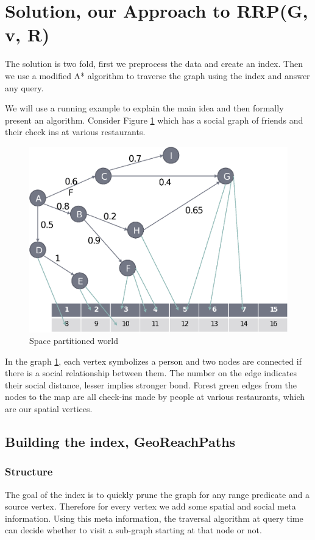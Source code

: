 \section{Solution, our Approach to RRP(G, v, R)}

{The solution is two fold, first we preprocess the data and create an index. Then we use a modified A* algorithm to traverse the graph using the index and answer any query.}

{We will use a running example to explain the main idea and then formally present an algorithm. Consider Figure \ref{fig:space-partitioned} which has a social graph of friends and their check ins at various restaurants.}

\begin{figure}[t]
	\includegraphics[width=0.9\linewidth]{images/image05.eps}
    \caption{Space partitioned world}
    \label{fig:space-partitioned}
\end{figure}

{In the graph \ref{fig:space-partitioned}, each vertex symbolizes a person and two nodes are connected if there is a social relationship between them. The number on the edge indicates their social distance, lesser implies stronger bond. Forest green edges from the nodes to the map are all check-ins made by people at various restaurants, which are our spatial vertices. }

\subsection{Building the index, GeoReachPaths}

\subsubsection{Structure}
The goal of the index is to quickly prune the graph for any range predicate and a source vertex. Therefore for every vertex we add some spatial and social meta information. Using this meta information, the traversal algorithm at query time can decide whether to visit a sub-graph starting at that node or not.

